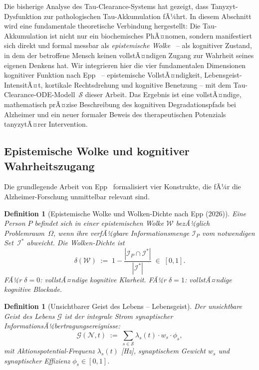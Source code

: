 ﻿\documentclass[12pt,a4paper]{article}
\newtheorem{definition}[theorem]{Definition}
\theoremstyle{definition}
\begin{document}
	Die bisherige Analyse des Tau-Clearance-Systems hat gezeigt, dass Tanyzyt-Dysfunktion
	zur pathologischen Tau-Akkumulation fÃ¼hrt. In diesem Abschnitt wird eine fundamentale
	theoretische Verbindung hergestellt: Die Tau-Akkumulation ist nicht nur ein biochemisches
	PhÃ¤nomen, sondern manifestiert sich direkt und formal messbar als \emph{epistemische
	Wolke}~\cite{Epp2026brn} -- als kognitiver Zustand, in dem der betroffene Mensch keinen
	vollstÃ¤ndigen Zugang zur Wahrheit seines eigenen Denkens hat. Wir integrieren hier die
	vier fundamentalen Dimensionen kognitiver Funktion nach Epp~\cite{Epp2026brn} --
	epistemische VollstÃ¤ndigkeit, Lebensgeist-IntensitÃ¤t, kortikale Rechtsdrehung und
	kognitive Benetzung -- mit dem Tau-Clearance-ODE-Modell~$\mathcal{S}$ dieser Arbeit.
	Das Ergebnis ist eine vollstÃ¤ndige, mathematisch prÃ¤zise Beschreibung des kognitiven
	Degradationspfads bei Alzheimer und ein neuer formaler Beweis des therapeutischen
	Potenzials tanyzytÃ¤rer Intervention.

	\subsection{Epistemische Wolke und kognitiver Wahrheitszugang}

	Die grundlegende Arbeit von Epp~\cite{Epp2026brn} formalisiert vier Konstrukte, die fÃ¼r
	die Alzheimer-Forschung unmittelbar relevant sind.

	\begin{definition}[Epistemische Wolke und Wolken-Dichte nach Epp (2026)]
		\label{def:epist_wolke}
		Eine Person $P$ befindet sich in einer \emph{epistemischen Wolke} $\mathcal{W}$
		bezÃ¼glich Problemraum~$\Omega$, wenn ihre verfÃ¼gbare Informationsmenge
		$\mathcal{I}_P$ vom notwendigen Set~$\mathcal{I}^*$ abweicht. Die
		\emph{Wolken-Dichte} ist
		\[
			\delta(\mathcal{W}) \;:=\; 1 - \frac{|\mathcal{I}_P \cap \mathcal{I}^*|}{|\mathcal{I}^*|}
			\;\in\; [0,1].
		\]
		FÃ¼r $\delta = 0$: vollstÃ¤ndige kognitive Klarheit. FÃ¼r $\delta = 1$: vollstÃ¤ndige
		kognitive Blockade.
	\end{definition}

	\begin{definition}[Unsichtbarer Geist des Lebens -- Lebensgeist]
		\label{def:lebensgeist}
		Der \emph{unsichtbare Geist des Lebens} $\mathcal{G}$ ist der integrale Strom
		synaptischer InformationsÃ¼bertragungsereignisse:
		\[
			\mathcal{G}(\mathcal{N}, t) \;:=\; \sum_{s \in \mathcal{S}}
			\lambda_s(t) \cdot w_s \cdot \phi_s,
		\]
		mit Aktionspotential-Frequenz $\lambda_s(t)$ [Hz], synaptischem Gewicht $w_s$ und
		synaptischer Effizienz $\phi_s \in [0,1]$.
	\end{definition}
\end{document}

